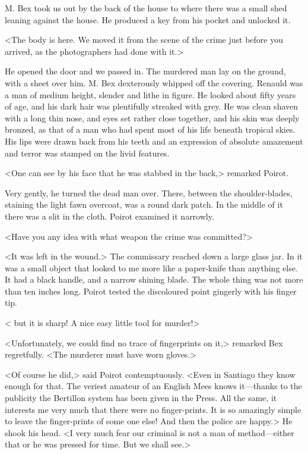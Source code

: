  M. Bex took us out by the back of the house to where there was a small shed leaning against the house. He produced a key from his pocket and unlocked it. 

 <The body is here. We moved it from the scene of the crime just before you arrived, as the photographers had done with it.> 

 He opened the door and we passed in. The murdered man lay on the ground, with a sheet over him. M. Bex dexterously whipped off the covering. Renauld was a man of medium height, slender and lithe in figure. He looked about fifty years of age, and his dark hair was plentifully streaked with grey. He was clean shaven with a long thin nose, and eyes set rather close together, and his skin was deeply bronzed, as that of a man who had spent most of his life beneath tropical skies. His lips were drawn back from his teeth and an expression of absolute amazement and terror was stamped on the livid features. 

 <One can see by his face that he was stabbed in the back,> remarked Poirot. 

 Very gently, he turned the dead man over. There, between the shoulder-blades, staining the light fawn overcoat, was a round dark patch. In the middle of it there was a slit in the cloth. Poirot examined it narrowly. 

 <Have you any idea with what weapon the crime was committed?> 

 <It was left in the wound.> The commissary reached down a large glass jar. In it was a small object that looked to me more like a paper-knife than anything else. It had a black handle, and a narrow shining blade. The whole thing was not more than ten inches long. Poirot tested the discoloured point gingerly with his finger tip. 

 < but it is sharp! A nice easy little tool for murder!> 

 <Unfortunately, we could find no trace of fingerprints on it,> remarked Bex regretfully. <The murderer must have worn gloves.> 

 <Of course he did,> said Poirot contemptuously. <Even in Santiago they know enough for that. The veriest amateur of an English Mees knows it—thanks to the publicity the Bertillon system has been given in the Press. All the same, it interests me very much that there were no finger-prints. It is so amazingly simple to leave the finger-prints of some one else! And then the police are happy.> He shook his head. <I very much fear our criminal is not a man of method—either that or he was pressed for time. But we shall see.> 

